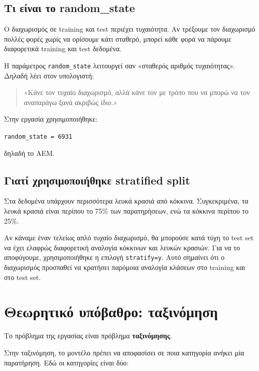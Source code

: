 \documentclass[12pt,a4paper]{article}
\newcommand{\code}[1]{\texttt{\textenglish{#1}}}
\begin{document}
\subsection{Τι είναι το random\_state}

Ο διαχωρισμός σε training και test περιέχει τυχαιότητα. Αν τρέξουμε τον
διαχωρισμό πολλές φορές χωρίς να ορίσουμε κάτι σταθερό, μπορεί κάθε φορά να
πάρουμε διαφορετικά training και test δεδομένα.

Η παράμετρος \code{random\_state} λειτουργεί σαν «σταθερός αριθμός
τυχαιότητας». Δηλαδή λέει στον υπολογιστή:

\begin{quote}
«Κάνε τον τυχαίο διαχωρισμό, αλλά κάνε τον με τρόπο που να μπορώ να τον
αναπαράγω ξανά ακριβώς ίδιο.»
\end{quote}

Στην εργασία χρησιμοποιήθηκε:

\begin{center}
\code{random\_state = 6931}
\end{center}

δηλαδή το ΑΕΜ.

\subsection{Γιατί χρησιμοποιήθηκε stratified split}

Στα δεδομένα υπάρχουν περισσότερα λευκά κρασιά από κόκκινα. Συγκεκριμένα, τα
λευκά κρασιά είναι περίπου το 75\% των παρατηρήσεων, ενώ τα κόκκινα περίπου
το 25\%.

Αν κάναμε έναν τελείως απλό τυχαίο διαχωρισμό, θα μπορούσε κατά τύχη το test
set να έχει ελαφρώς διαφορετική αναλογία κόκκινων και λευκών κρασιών. Για να
το αποφύγουμε, χρησιμοποιήθηκε η επιλογή \code{stratify=y}. Αυτό σημαίνει ότι
ο διαχωρισμός προσπαθεί να κρατήσει παρόμοια αναλογία κλάσεων στο training
και στο test set.

\section{Θεωρητικό υπόβαθρο: ταξινόμηση}

Το πρόβλημα της εργασίας είναι πρόβλημα \textbf{ταξινόμησης}.

Στην ταξινόμηση, το μοντέλο πρέπει να αποφασίσει σε ποια κατηγορία ανήκει μία
παρατήρηση. Εδώ οι κατηγορίες είναι δύο:
\end{document}
